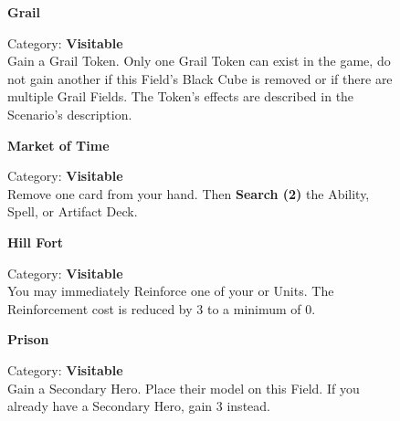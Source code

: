 \begin{figure}[H]
  \begin{minipage}[t]{0.47\textwidth}
    \vspace{0pt}
    \centering
    \phantom{j}\textbf{Grail}\par
    \caption{\small Category: \textbf{Visitable}\\Gain a Grail Token.
    Only one Grail Token can exist in the game, do not gain another if this Field's Black Cube is removed or if there are multiple Grail Fields.
    The Token's effects are described in the Scenario's description.
    \phantom{\ldots\ldots\ldots}}
  \end{minipage}\hfill
  \begin{minipage}[t]{0.47\textwidth}
    \vspace{0pt}
    \centering
    \phantom{j}\textbf{Market of Time}\par
    \caption{\small Category: \textbf{Visitable}\\ Remove one card from your hand.
      Then \textbf{Search (2)} the Ability, Spell, or Artifact Deck.
    }
  \end{minipage}
\end{figure}

\begin{figure}[H]
  \begin{minipage}[t]{0.47\textwidth}
    \vspace{0pt}
    \centering
    \phantom{j}\textbf{Hill Fort}\par
    \caption{\small Category: \textbf{Visitable}\\
      You may immediately Reinforce one of your  or  Units.
      The Reinforcement cost is reduced by 3  to a minimum of 0.}
  \end{minipage}\hfill
  \begin{minipage}[t]{0.47\textwidth}
    \vspace{0pt}
    \centering
    \phantom{j}\textbf{Prison}\par
    \caption{\small Category: \textbf{Visitable}\\
      Gain a Secondary Hero.
      Place their model on this Field.
      If you already have a Secondary Hero, gain 3  instead.}
  \end{minipage}
\end{figure}

